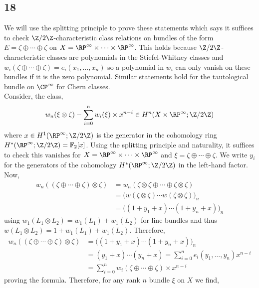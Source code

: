 \documentclass[12pt]{extarticle}
\newcommand{\F}{\mathbb{F}}
\begin{document}
\subsection{18}

We will use the splitting principle to prove these statements which says it suffices to check $\Z / 2 \Z$-characteristic class relations on bundles of the form $E = \zeta \oplus \cdots \oplus \zeta$ on $X = \RP^\infty \times \cdots \times \RP^\infty$. This holds because $\Z/2\Z$-characteristic classes are polynomials in the Stiefel-Whitney classes and $w_i(\zeta \oplus \cdots \oplus \zeta) = e_i(x_1, \dots, x_n)$ so a polynomial in $w_i$ can only vanish on these bundles if it is the zero polynomial. Similar statements hold for the tautological bundle on $\CP^\infty$ for Chern classes.
\bigskip\\
Consider, the class,
\begin{align*}
w_n(\xi \otimes \zeta) - \sum_{i = 0}^{n} w_i(\xi) \times x^{n-i} \in H^n(X \times \RP^\infty; \Z /2 \Z) 
\end{align*}
where $x \in H^1(\RP^\infty; \Z/2\Z)$ is the generator in the cohomology ring $H^*(\RP^\infty; \Z / 2 \Z) = \F_2[x]$.
Using the splitting principle and naturality, it suffices to check this vanishes for $X = \RP^\infty \times \cdots \times \RP^\infty$ and $\xi = \zeta \oplus \cdots \oplus \zeta$. We write $y_i$ for the generators of the cohomology $H^*(\RP^\infty; \Z/2\Z)$ in the left-hand factor. Now,
\begin{align*}
w_n \left( (\zeta \oplus \cdots \oplus \zeta) \otimes \zeta \right) & = w_n(\zeta \otimes \zeta \oplus \cdots \oplus \zeta \otimes \zeta)
\\
& = \big( w(\zeta \otimes \zeta) \cdots w(\zeta \otimes \zeta) \big)_n
\\
& = \big( (1 + y_1 + x) \cdots (1 + y_n + x) \big)_n
\end{align*}
using $w_1(L_1 \otimes L_2) = w_1(L_1) + w_1(L_2)$ for line bundles and thus $w(L_1 \otimes L_2) = 1 + w_1(L_1) + w_1(L_2)$. 
Therefore,
\begin{align*}
w_n \left( (\zeta \oplus \cdots \oplus \zeta) \otimes \zeta \right) & = \big( (1 + y_1 + x) \cdots (1 + y_n + x) \big)_n
\\
& = (y_1 + x) \cdots (y_n + x) = \sum_{i = 0}^n e_i(y_1, \dots, y_n) x^{n-i} 
\\
& = \sum_{i = 0}^n w_i(\zeta \oplus \cdots \oplus \zeta) \times x^{n-i} 
\end{align*}
proving the formula.
Therefore, for any rank $n$ bundle $\xi$ on $X$ we find,
\end{document}
